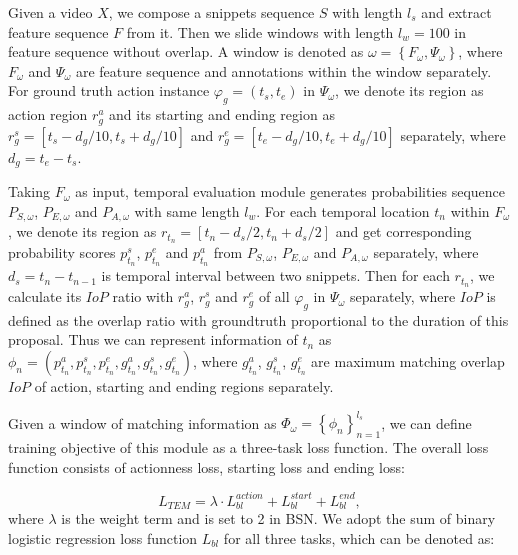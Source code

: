 \documentclass[runningheads]{llncs}
\begin{document}
Given a video $X$, we compose a snippets sequence $S$ with length $l_s$ and extract feature sequence $F$ from it. 
Then we slide windows with length $l_w=100$ in feature sequence without overlap.
A window is denoted as $\omega =\left \{ F_{\omega}, \Psi_{\omega} \right \}$, where $F_{\omega}$ and $\Psi_{\omega}$ are feature sequence and annotations within the window separately. 
 For ground truth action instance $\varphi_g=( t_{s},t_{e} )$ in  $\Psi_{\omega}$, we denote its region as action region $r_{g}^a$ and its starting and ending region as $r_g^s=[ t_s-d_g/10,t_s+d_g/10 ]$ and $r_g^e= [ t_e-d_g/10,t_e+d_g/10 ]$ separately, where $d_g=t_e-t_s$.

Taking $F_{\omega}$ as input, temporal evaluation module generates probabilities sequence $P_{S,\omega}$, $P_{E,\omega}$ and $P_{A,\omega}$ with same length $l_w$. 
For each temporal location $t_n$ within $F_{\omega}$, we denote its region as $r _{t_n}=[ t_n-d_s/2,t_n+d_s/2 ]$ and get corresponding probability scores $p^s_{t_n}$, $p^e_{t_n}$ and $p^a_{t_n}$ from $P_{S,\omega}$, $P_{E,\omega}$ and $P_{A,\omega}$ separately, where $d_s=t_{n}-t_{n-1}$ is temporal interval between two snippets. 
Then for each  $r_{t_n}$, we calculate its $IoP$ ratio with $r_{g}^a$, $r_g^s$ and $r_g^e$ of all $\varphi_g$ in $\Psi_{\omega}$ separately, where $IoP$ is defined as the overlap ratio with groundtruth proportional to the duration of this proposal. Thus we can represent information of $t_n$ as $\phi_{n}=(p^a_{t_n},p^s_{t_n},p^e_{t_n},g^{a}_{t_n},g^{s}_{t_n},g^{e}_{t_n})$, where $g^{a}_{t_n}$, $g^{s}_{t_n}$, $g^{e}_{t_n}$ are maximum matching overlap $IoP$ of action, starting and ending regions separately.

Given a window of matching information as $\Phi_{\omega}=\left \{ \phi_n \right \}_{n=1}^{l_s}$, we can define training objective of this module as a three-task loss function. The overall loss function consists of actionness loss, starting loss and ending loss:


\begin{equation}
L_{TEM}=\lambda \cdot L_{bl}^{action}+L_{bl}^{start}+L_{bl}^{end} ,
\end{equation}
where $\lambda$ is the weight term and is set to 2 in BSN. We adopt the sum of binary logistic regression loss function $L_{bl}$ for all three tasks, which can be denoted as:
\end{document}
